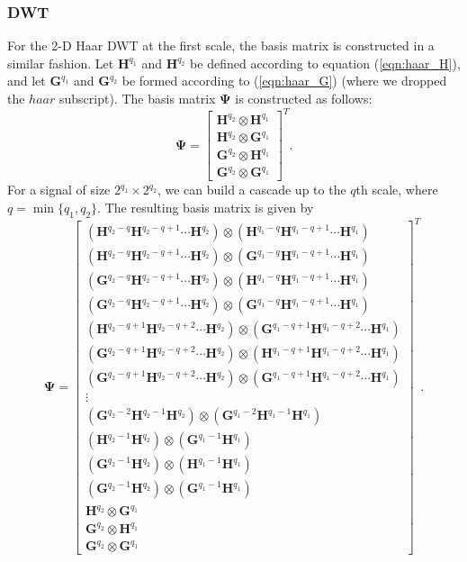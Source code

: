 \subsubsection{DWT}
For the 2-D Haar DWT at the first scale, the basis matrix is constructed in a similar fashion.
Let $\bm H^{q_1}$ and $\bm H^{q_2}$ be defined according to equation (\ref{eqn:haar_H}), and let $\bm G^{q_1}$ and $\bm G^{q_2}$  be formed according to (\ref{eqn:haar_G}) (where we dropped the $haar$ subscript). 
The basis matrix $\bm\Psi$ is constructed as follows:
\begin{equation*}
 \bm \Psi = 
  \begin{bmatrix}
    \bm H^{q_2} \otimes\bm H^{q_1} \\
    \bm H^{q_2} \otimes \bm G^{q_1} \\
    \bm G^{q_2} \otimes \bm H^{q_1} \\
    \bm G^{q_2} \otimes \bm G^{q_1} 
  \end{bmatrix}^T.
\end{equation*}
For a signal of size $2^{q_1}\times 2^{q_2}$, we can build a cascade up to the $q$th scale, where $q = \min\{q_1,q_2\}$.
The resulting basis matrix is given by
\begin{equation*}
\label{eqn:haar2_fullbasis}
  \bm \Psi = 
  \begin{bmatrix}
    (\bm H^{q_2-q}\bm H^{q_2-q+1} \cdots \bm H^{q_2}) \otimes (\bm H^{q_1-q} \bm H^{q_1-q+1}\cdots\bm H^{q_1}) \\
    (\bm H^{q_2-q}\bm H^{q_2-q+1} \cdots \bm H^{q_2}) \otimes (\bm G^{q_1-q} \bm H^{q_1-q+1}\cdots\bm H^{q_1}) \\
    (\bm G^{q_2-q}\bm H^{q_2-q+1} \cdots \bm H^{q_2}) \otimes (\bm H^{q_1-q} \bm H^{q_1-q+1}\cdots\bm H^{q_1}) \\
    (\bm G^{q_2-q}\bm H^{q_2-q+1} \cdots \bm H^{q_2}) \otimes (\bm G^{q_1-q} \bm H^{q_1-q+1}\cdots\bm H^{q_1}) \\
    (\bm H^{q_2-q+1}\bm H^{q_2-q+2} \cdots \bm H^{q_2}) \otimes (\bm G^{q_1-q+1} \bm H^{q_1-q+2}\cdots\bm H^{q_1}) \\
    (\bm G^{q_2-q+1}\bm H^{q_2-q+2} \cdots \bm H^{q_2}) \otimes (\bm H^{q_1-q+1} \bm H^{q_1-q+2}\cdots\bm H^{q_1}) \\
    (\bm G^{q_2-q+1}\bm H^{q_2-q+2} \cdots \bm H^{q_2}) \otimes (\bm G^{q_1-q+1} \bm H^{q_1-q+2}\cdots\bm H^{q_1}) \\
    \vdots \\
    (\bm G^{q_2-2}\bm H^{q_2-1} \bm H^{q_2}) \otimes (\bm G^{q_1-2}\bm H^{q_1-1}\bm H^{q_1}) \\
    (\bm H^{q_2-1} \bm H^{q_2}) \otimes (\bm G^{q_1-1}\bm H^{q_1}) \\
    (\bm G^{q_2-1} \bm H^{q_2}) \otimes (\bm H^{q_1-1}\bm H^{q_1}) \\
    (\bm G^{q_2-1} \bm H^{q_2}) \otimes (\bm G^{q_1-1}\bm H^{q_1}) \\
    \bm H^{q_2} \otimes \bm G^{q_1} \\
    \bm G^{q_2} \otimes \bm H^{q_1} \\
    \bm G^{q_2} \otimes \bm G^{q_1} 
  \end{bmatrix}^T.
\end{equation*}
